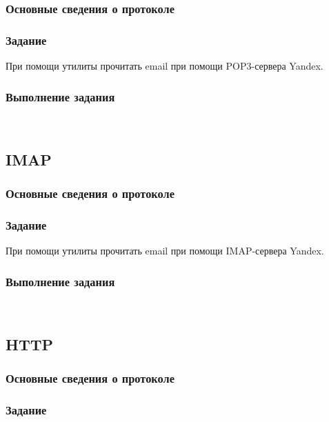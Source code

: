 \subsubsection{Основные сведения о протоколе}

\subsubsection{Задание}

При помощи утилиты  прочитать email при помощи POP3-сервера Yandex.

\subsubsection{Выполнение задания}\ 



\subsection{IMAP}

\subsubsection{Основные сведения о протоколе}

\subsubsection{Задание}

При помощи утилиты  прочитать email при помощи IMAP-сервера Yandex.

\subsubsection{Выполнение задания}\ 



\subsection{HTTP}

\subsubsection{Основные сведения о протоколе}

\subsubsection{Задание}

